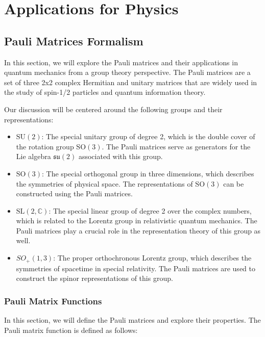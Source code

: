 \chapter{Applications for Physics}

\section{Pauli Matrices Formalism}

In this section, we will explore the Pauli matrices and their applications in quantum mechanics from a group theory perspective. The Pauli matrices are a set of three 2x2 complex Hermitian and unitary matrices that are widely used in the study of spin-1/2 particles and quantum information theory.

Our discussion will be centered around the following groups and their representations:
\begin{itemize}
    \item \(\mathrm{SU}(2)\): The special unitary group of degree 2, which is the double cover of the rotation group \(\mathrm{SO}(3)\). The Pauli matrices serve as generators for the Lie algebra \(\mathfrak{su}(2)\) associated with this group.
    \item \(\mathrm{SO}(3)\): The special orthogonal group in three dimensions, which describes the symmetries of physical space. The representations of \(\mathrm{SO}(3)\) can be constructed using the Pauli matrices.
    \item \(\mathrm{SL}(2, \mathbb{C})\): The special linear group of degree 2 over the complex numbers, which is related to the Lorentz group in relativistic quantum mechanics. The Pauli matrices play a crucial role in the representation theory of this group as well.
    \item \(SO_+(1,3)\): The proper orthochronous Lorentz group, which describes the symmetries of spacetime in special relativity. The Pauli matrices are used to construct the spinor representations of this group.
\end{itemize}

\subsection{Pauli Matrix Functions}

In this section, we will define the Pauli matrices and explore their properties. The Pauli matrix function is defined as follows:

